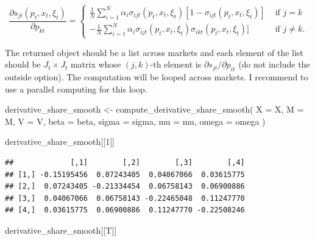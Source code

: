 \documentclass[
]{book}
\newenvironment{Shaded}{\begin{snugshade}}{\end{snugshade}}
\newcommand{\AttributeTok}[1]{\textcolor[rgb]{0.77,0.63,0.00}{#1}}
\newcommand{\DecValTok}[1]{\textcolor[rgb]{0.00,0.00,0.81}{#1}}
\newcommand{\FunctionTok}[1]{\textcolor[rgb]{0.00,0.00,0.00}{#1}}
\newcommand{\NormalTok}[1]{#1}
\newcommand{\OtherTok}[1]{\textcolor[rgb]{0.56,0.35,0.01}{#1}}
\begin{document}
\[
\frac{\partial s_{jt}(p_t, x_t, \xi_t)}{\partial p_{kt}} = 
\begin{cases}
\frac{1}{N} \sum_{i = 1}^N \alpha_i \sigma_{ijt}(p_t, x_t, \xi_t)[1 - \sigma_{ijt}(p_t, x_t, \xi_t)] &\text{   if   } j = k\\
- \frac{1}{N}\sum_{i = 1}^N \alpha_i \sigma_{ijt}(p_t, x_t, \xi_t)\sigma_{ikt}(p_t, x_t, \xi_t)] &\text{   if   } j \neq k.
\end{cases}
\]

The returned object should be a list across markets and each element of the list should be \(J_t \times J_t\) matrix whose \((j, k)\)-th element is \(\partial s_{jt}/\partial p_{it}\) (do not include the outside option). The computation will be looped across markets. I recommend to use a parallel computing for this loop.

\begin{Shaded}
\begin{Highlighting}[]
\NormalTok{derivative\_share\_smooth }\OtherTok{\textless{}{-}}
  \FunctionTok{compute\_derivative\_share\_smooth}\NormalTok{(}
    \AttributeTok{X =}\NormalTok{ X,}
    \AttributeTok{M =}\NormalTok{ M, }
    \AttributeTok{V =}\NormalTok{ V, }
    \AttributeTok{beta =}\NormalTok{ beta, }
    \AttributeTok{sigma =}\NormalTok{ sigma, }
    \AttributeTok{mu =}\NormalTok{ mu, }
    \AttributeTok{omega =}\NormalTok{ omega}
\NormalTok{    )}
\end{Highlighting}
\end{Shaded}

\begin{Shaded}
\begin{Highlighting}[]
\NormalTok{derivative\_share\_smooth[[}\DecValTok{1}\NormalTok{]]}
\end{Highlighting}
\end{Shaded}

\begin{verbatim}
##             [,1]        [,2]        [,3]        [,4]
## [1,] -0.15195456  0.07243405  0.04067066  0.03615775
## [2,]  0.07243405 -0.21334454  0.06758143  0.06900886
## [3,]  0.04067066  0.06758143 -0.22465048  0.11247770
## [4,]  0.03615775  0.06900886  0.11247770 -0.22508246
\end{verbatim}

\begin{Shaded}
\begin{Highlighting}[]
\NormalTok{derivative\_share\_smooth[[T]]}
\end{Highlighting}
\end{Shaded}
\end{document}
